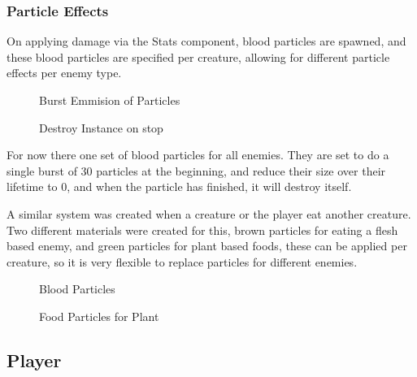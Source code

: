 \documentclass[11pt]{report}
\begin{document}
\subsubsection{Particle Effects}
On applying damage via the Stats component, blood particles are spawned, and these blood particles are specified per creature, allowing for different particle effects per enemy type. 

\begin{figure}[H]
    \begin{minipage}{.5\textwidth}
        \centering
        \caption{Burst Emmision of Particles}
    \end{minipage}
    \begin{minipage}{.5\textwidth}
        \centering
        \caption{Destroy Instance on stop}
    \end{minipage}
\end{figure}

For now there one set of blood particles for all enemies. They are set to do a single burst of 30 particles at the beginning, and reduce their size over their lifetime to 0, and when the particle has finished, it will destroy itself. 

A similar system was created when a creature or the player eat another creature. Two different materials were created for this, brown particles for eating a flesh based enemy, and green particles for plant based foods, these can be applied per creature, so it is very flexible to replace particles for different enemies.

\begin{figure}[H]
    \begin{minipage}{.5\textwidth}
        \centering
        \caption{Blood Particles}
    \end{minipage}
    \begin{minipage}{.5\textwidth}
        \centering
        \caption{Food Particles for Plant}
    \end{minipage}
\end{figure}

\subsection{Player}
\end{document}
